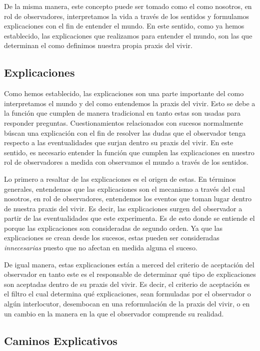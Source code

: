 \documentclass[10pt]{article}
\begin{document}
        De la misma manera, este concepto puede ser tomado como el como nosotros, en rol de observadores, interpretamos la vida a través de los sentidos y formulamos explicaciones con el fin de entender el mundo. En este sentido, como ya hemos establecido, las explicaciones que realizamos para entender el mundo, son las que determinan el como definimos nuestra propia praxis del vivir. 

        \subsection{Explicaciones}

        Como hemos establecido, las explicaciones son una parte importante del como interpretamos el mundo y del como entendemos la praxis del vivir. Esto se debe a la función que cumplen de manera tradicional en tanto estas son usadas para responder preguntas. Cuestionamientos relacionados con sucesos normalmente búscan una explicación con el fin de resolver las dudas que el observador tenga respecto a las eventualidades que surjan dentro su praxis del vivir. En este sentido, es necesario entender la función que cumplen las explicaciones en nuestro rol de observadores a medida con observamos el mundo a través de los sentidos. 

        Lo primero a resaltar de las explicaciones es el origen de estas. En términos generales, entendemos que las explicaciones son el mecanismo a través del cual nosotros, en rol de observadores, entendemos los eventos que toman lugar dentro de nuestra praxis del vivir. Es decir, las explicaciones surgen del observador a partir de las eventualidades que este experimenta. Es de esto donde se entiende el porque las explicaciones son consideradas de segundo orden. Ya que las explicaciones se crean desde los sucesos, estas pueden ser consideradas \textit{innecesarias} puesto que no afectan en medida alguna el suceso.  

        De igual manera, estas explicaciones están a merced del criterio de aceptación del observador en tanto este es el responsable de determinar qué tipo de explicaciones son aceptadas dentro de su praxis del vivir. Es decir, el criterio de aceptación es el filtro el cual determina qué explicaciones, sean formuladas por el observador o algún interlocutor, desembocan en una reformulación de la praxis del vivir, o en un cambio en la manera en la que el observador comprende su realidad.

        \subsection{Caminos Explicativos}
\end{document}
